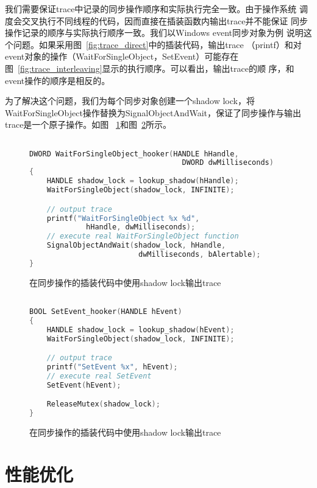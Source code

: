 我们需要保证trace中记录的同步操作顺序和实际执行完全一致。由于操作系统
调度会交叉执行不同线程的代码，因而直接在插装函数内输出trace并不能保证
同步操作记录的顺序与实际执行顺序一致。我们以Windows event同步对象为例
说明这个问题。如果采用图~\ref{fig:trace_direct}中的插装代码，输出trace
（printf）和对event对象的操作（WaitForSingleObject，SetEvent）可能存在
图~\ref{fig:trace_interleaving}显示的执行顺序。可以看出，输出trace的顺
序，和event操作的顺序是相反的。

为了解决这个问题，我们为每个同步对象创建一个shadow lock，将
WaitForSingleObject操作替换为SignalObjectAndWait，保证了同步操作与输出
trace是一个原子操作。如图
~\ref{fig:trace_shadowlock1}和图~\ref{fig:trace_shadowlock2}所示。

\begin{figure}
\centering
\begin{lstlisting}[language=C++, basicstyle=\small]

DWORD WaitForSingleObject_hooker(HANDLE hHandle, 
                                   DWORD dwMilliseconds)
{
    HANDLE shadow_lock = lookup_shadow(hHandle);
    WaitForSingleObject(shadow_lock, INFINITE);

    // output trace
    printf("WaitForSingleObject %x %d", 
             hHandle, dwMilliseconds);
    // execute real WaitForSingleObject function
    SignalObjectAndWait(shadow_lock, hHandle, 
                         dwMilliseconds, bAlertable);
}
\end{lstlisting}
\caption{在同步操作的插装代码中使用shadow lock输出trace}
\label{fig:trace_shadowlock1}
\end{figure}

\begin{figure}
\centering
\begin{lstlisting}[language=C++, basicstyle=\small]

BOOL SetEvent_hooker(HANDLE hEvent)
{
    HANDLE shadow_lock = lookup_shadow(hEvent);
    WaitForSingleObject(shadow_lock, INFINITE);

    // output trace
    printf("SetEvent %x", hEvent);
    // execute real SetEvent
    SetEvent(hEvent);

    ReleaseMutex(shadow_lock);
}

\end{lstlisting}
\caption{在同步操作的插装代码中使用shadow lock输出trace}
\label{fig:trace_shadowlock2}
\end{figure}

\section{性能优化}
\label{sec:scp:optimization}

